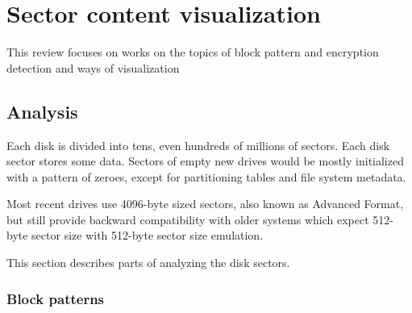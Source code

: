 \documentclass[
  digital, %
  color,   %
  oneside, %
  lof,     %
  nolot,     %
]{fithesis4}
\begin{document}

\chapter{Sector content visualization}
\label{chap:sector-content-visualization}

This review focuses on works on the topics of block pattern and encryption detection and ways of visualization

\section{Analysis}
\label{sec:analysis}

Each disk is divided into tens, even hundreds of millions of sectors.
Each disk sector stores some data.
Sectors of empty new drives would be mostly initialized with a pattern of zeroes, except for partitioning tables and file system metadata.

Most recent drives use 4096-byte sized sectors, also known as Advanced Format, but still provide backward compatibility with older systems which expect 512-byte sector size with 512-byte sector size emulation.\cite{seagate} 

This section describes parts of analyzing the disk sectors.

\subsection{Block patterns}
\label{ssec:block-analysis}
\end{document}
